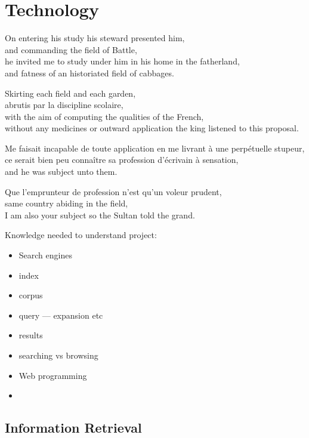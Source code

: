 
\chapter{Technology}
\label{ch:technology}

\startcontents[chapters]

\vfill

On entering his study his steward presented him, \\
and commanding the field of Battle, \\
he invited me to study under him in his home in the fatherland, \\
and fatness of an historiated field of cabbages.

Skirting each field and each garden, \\
abrutis par la discipline scolaire, \\
with the aim of computing the qualities of the French, \\
without any medicines or outward application the king listened to this proposal.

Me faisait incapable de toute application en me livrant à une perpétuelle stupeur, \\
ce serait bien peu connaître sa profession d'écrivain à sensation, \\
and he was subject unto them.

Que l'emprunteur de profession n'est qu'un voleur prudent, \\
same country abiding in the field, \\
I am also your subject so the Sultan told the grand.

\newpage
\minicontents
\spirals

Knowledge needed to understand project:
\begin{itemize}
  \item Search engines
  \item index
  \item corpus
  \item query --- expansion etc
  \item results
  \item searching vs browsing
  \item Web programming
  \item
\end{itemize}


\section{Information Retrieval}

